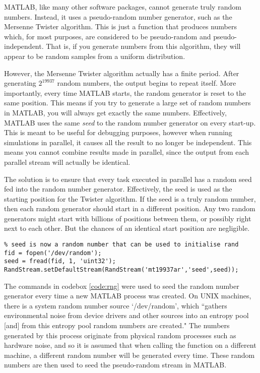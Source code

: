 \documentclass[11pt]{article}
\numberwithin{equation}{subsection}
\begin{document}
MATLAB, like many other software packages, cannot generate truly random numbers. Instead, it uses a pseudo-random number generator, such as the Mersenne Twister algorithm. This is just a function that produces numbers which, for most purposes, are considered to be pseudo-random and pseudo-independent. That is, if you generate numbers from this algorithm, they will appear to be random samples from a uniform distribution. 

However, the Mersenne Twister algorithm actually has a finite period. After generating $2^{19937}$ random numbers, the output begins to repeat itself. More importantly, every time MATLAB starts, the random generator is reset to the same position. This means if you try to generate a large set of random numbers in MATLAB, you will always get exactly the same numbers. Effectively, MATLAB uses the same \textit{seed} to the random number generator on every start-up. This is meant to be useful for debugging purposes, however when running simulations in parallel, it causes all the result to no longer be independent. This means you cannot combine results made in parallel, since the output from each parallel stream will actually be identical.

The solution is to ensure that every task executed in parallel has a random seed fed into the random number generator. Effectively, the seed is used as the starting position for the Twister algorithm. If the seed is a truly random number, then each random generator should start in a different position. Any two random generators might start with billions of positions between them, or possibly right next to each other. But the chances of an identical start position are negligible.

\begin{lstlisting}[float=ht,style=Matlab-editor,caption = {Seeding random generator},label=code:rng]
% Ensures truly random numbers for each process
% seed is now a random number that can be used to initialise rand
fid = fopen('/dev/random');
seed = fread(fid, 1, 'uint32');
RandStream.setDefaultStream(RandStream('mt19937ar','seed',seed));
\end{lstlisting}

The commands in codebox \ref{code:rng} were used to seed the random number generator every time a new MATLAB process was created. On UNIX machines, there is a system random number source \mbox{`/dev/random'}, which ``gathers environmental noise from device drivers and other sources into an entropy pool [and] from this entropy pool random numbers are created." The numbers generated by this process originate from physical random processes such as hardware noise, and so it is assumed that when calling the function on a different machine, a different random number will be generated every time. These random numbers are then used to seed the pseudo-random stream in MATLAB. 
\end{document}
